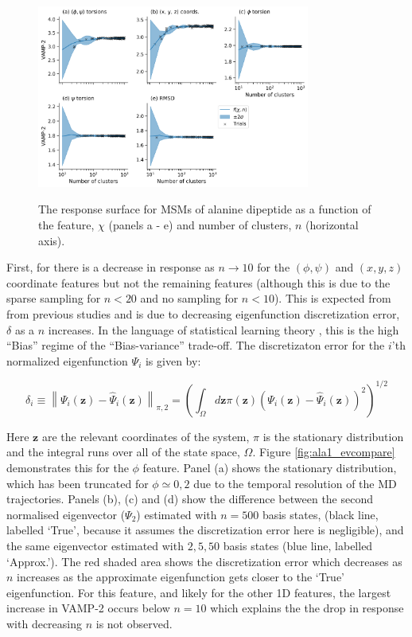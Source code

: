 \begin{figure}[ht]
    \centering
    \caption{The response surface for MSMs of alanine dipeptide as a function of the feature, $\chi$ (panels a - e) and number of clusters, $n$ (horizontal axis).  }
    \includegraphics[width=0.8\textwidth]{chapters/msm_optimization/figures/ala1_response_surface.png}
    \label{fig:ala1_response}
\end{figure}

First, for there is a decrease in response as $n \rightarrow 10$ for the $(\phi, \psi)$ and $(x,y,z)$ coordinate features but not the remaining features (although this is due to the sparse sampling for $n<20$ and no sampling for $n<10$). This is expected from from previous studies \cite{wuVariationalApproachLearning2019}\cite{mcgibbonVariationalCrossvalidationSlow2015} and is due to decreasing eigenfunction discretization error, $\delta$  \cite{prinzMarkovModelsMolecular2011} as a $n$ increases. In the language of statistical learning theory \cite{friedman2001elements}, this is the high ``Bias'' regime of the ``Bias-variance'' trade-off. The discretizaton error for the $i$'th normalized eigenfunction $\Psi_{i}$ is given by: 

\begin{equation}
    \delta_{i} \equiv\left\|\Psi_{i}(\mathbf{z})-\hat{\Psi}_{i}(\mathbf{z})\right\|_{\pi, 2}=\left(\int_{\Omega} d \mathbf{z} \pi(\mathbf{z})(\Psi_{i}(\mathbf{z})-\hat{\Psi}_{i}(\mathbf{z}))^{2}\right)^{1 / 2}
\end{equation}

Here $\mathbf{z}$ are the relevant coordinates of the system, $\pi$ is the stationary distribution and the integral runs over all of the state space, $\Omega$. Figure \ref{fig:ala1_evcompare} demonstrates this for the $\phi$ feature. Panel (a) shows the stationary distribution, which has been truncated for $\phi \simeq 0, 2$ due to the temporal resolution of the MD trajectories. Panels (b), (c) and (d) show the difference between the second normalised eigenvector ($\Psi_{2}$) estimated with $n=500$ basis states, (black line, labelled `True', because it assumes the discretization error here is negligible), and the same eigenvector estimated with $2, 5, 50$ basis states (blue line, labelled `Approx.'). The red shaded area shows the discretization error which decreases as $n$ increases as the approximate eigenfunction gets closer to the `True' eigenfunction. For this feature, and likely for the other 1D features, the largest increase in VAMP-2 occurs below $n=10$ which explains the the drop in response with decreasing $n$ is not observed. 

